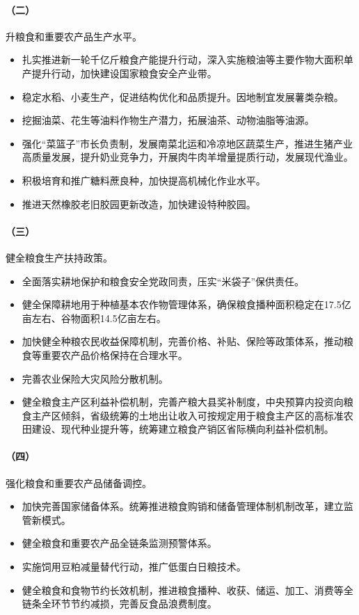 \paragraph{（二）}升粮食和重要农产品生产水平。

\begin{itemize}
    \item 扎实推进新一轮千亿斤粮食产能提升行动，深入实施粮油等主要作物大面积单产提升行动，加快建设国家粮食安全产业带。
    \item 稳定水稻、小麦生产，促进结构优化和品质提升。因地制宜发展薯类杂粮。
    \item 挖掘油菜、花生等油料作物生产潜力，拓展油茶、动物油脂等油源。
    \item 强化“菜篮子”市长负责制，发展南菜北运和冷凉地区蔬菜生产，推进生猪产业高质量发展，提升奶业竞争力，开展肉牛肉羊增量提质行动，发展现代渔业。
    \item 积极培育和推广糖料蔗良种，加快提高机械化作业水平。
    \item 推进天然橡胶老旧胶园更新改造，加快建设特种胶园。
\end{itemize}

\paragraph{（三）}健全粮食生产扶持政策。

\begin{itemize}
    \item 全面落实耕地保护和粮食安全党政同责，压实“米袋子”保供责任。
    \item 健全保障耕地用于种植基本农作物管理体系，确保粮食播种面积稳定在17.5亿亩左右、谷物面积14.5亿亩左右。
    \item 加快健全种粮农民收益保障机制，完善价格、补贴、保险等政策体系，推动粮食等重要农产品价格保持在合理水平。
    \item 完善农业保险大灾风险分散机制。
    \item 健全粮食主产区利益补偿机制，完善产粮大县奖补制度，中央预算内投资向粮食主产区倾斜，省级统筹的土地出让收入可按规定用于粮食主产区的高标准农田建设、现代种业提升等，统筹建立粮食产销区省际横向利益补偿机制。
\end{itemize}

\paragraph{（四）}强化粮食和重要农产品储备调控。

\begin{itemize}
    \item 加快完善国家储备体系。统筹推进粮食购销和储备管理体制机制改革，建立监管新模式。
    \item 健全粮食和重要农产品全链条监测预警体系。
    \item 实施饲用豆粕减量替代行动，推广低蛋白日粮技术。
    \item 健全粮食和食物节约长效机制，推进粮食播种、收获、储运、加工、消费等全链条全环节节约减损，完善反食品浪费制度。
\end{itemize}

